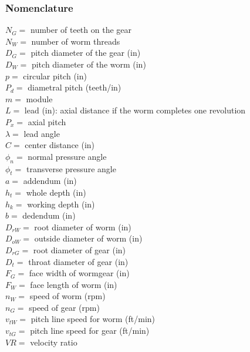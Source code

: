 \documentclass[11pt, fleqn]{article}
\begin{document}
\subsubsection{Nomenclature}
$N_G=$ number of teeth on the gear\\
$N_W=$ number of worm threads\\
$D_G=$ pitch diameter of the gear (in)\\
$D_W=$ pitch diameter of the worm (in)\\
$p=$ circular pitch (in)\\
$P_d=$ diametral pitch (teeth/in)\\
$m=$ module\\
$L=$ lead (in): axial distance if the worm completes one revolution\\
$P_x=$ axial pitch\\
$\lambda=$ lead angle\\
$C=$ center distance (in)\\
$\phi_n=$ normal pressure angle\\
$\phi_t=$ transverse pressure angle\\
$a=$ addendum (in)\\
$h_t=$ whole depth (in)\\
$h_k=$ working depth (in)\\
$b=$ dedendum (in)\\
$D_{rW}=$ root diameter of worm (in)\\
$D_{oW}=$ outside diameter of worm (in)\\
$D_{rG}=$ root diameter of gear (in)\\
$D_{t}=$ throat diameter of gear (in)\\
$F_G=$ face width of wormgear (in)\\
$F_W=$ face length of worm (in)\\
$n_W=$ speed of worm (rpm)\\
$n_G=$ speed of gear (rpm)\\
$v_{tW}=$ pitch line speed for worm (ft/min)\\
$v_{tG}=$ pitch line speed for gear (ft/min)\\
$VR=$ velocity ratio
\end{document}
